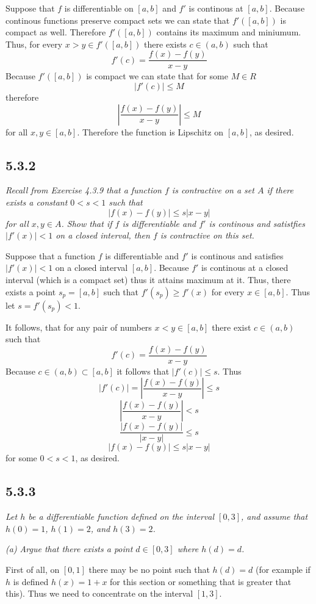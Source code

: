 \documentclass[11pt,oneside,titlepage]{book}
\begin{document}
Suppose that $f$ is differentiable on $[a, b]$ and $f'$ is continous at
$[a, b]$. Because continous functions preserve compact sets we can state that
$f'([a, b])$  is compact as well. Therefore $f'([a, b])$ contains its maximum
and miniumum. Thus, for every  $x > y \in f'([a, b])$ there exists
$c \in (a, b)$ such that
$$f'(c) = \frac{f(x) - f(y)}{x - y}$$
Because $f'([a, b])$ is compact  we can state that for some $M \in R$
$$|f'(c)| \leq M$$
therefore 
$$|\frac{f(x) - f(y)}{x - y}| \leq M$$
for all $x, y \in [a, b]$. Therefore the function is Lipschitz on $[a, b]$,
as desired.

\subsection*{5.3.2}
\textit{Recall from Exercise 4.3.9 that a function $f$ is contractive on a
  set $A$ if there exists a constant $0 < s < 1$ such that }
$$|f(x) - f(y)| \leq s|x - y|$$
\textit{for all $x, y \in A$. Show that if $f$ is differentiable and $f'$ is
  continous and satistfies $|f'(x)| < 1$ on a closed interval, then $f$ is
  contractive on this set.}

Suppose that a function $f$ is differentiable and $f'$ is continous and
satisfies $|f'(x)| < 1$ on a closed interval $[a, b]$. Because $f'$ is
continous at a closed interval (which is a compact set) thus it attains
maximum at it. Thus, there exists a point  $s_p = [a, b]$ such that
$f'(s_p) \geq f'(x)$ for every $x \in [a, b]$. Thus let $s = f'(s_p) < 1$.

It follows, that for
any pair of numbers $x< y \in [a, b]$ there exist $c \in (a, b)$ such that
$$f'(c) = \frac{f(x) - f(y)}{x - y}$$
Because $c \in (a, b) \subset [a, b]$ it follows that $|f'(c)| \leq s$. Thus
$$|f'(c)| = |\frac{f(x) - f(y)}{x - y}| \leq s$$
$$\left|\frac{f(x) - f(y)}{x - y}\right| < s$$
$$\frac{|f(x) - f(y)|}{|x - y|} \leq s$$
$$|f(x) - f(y)| \leq s|x - y|$$
for some $0 < s < 1$, as desired.


\subsection*{5.3.3}
\textit{Let $h$ be a differentiable function defined on the interval $[0, 3]$,
  and assume that $h(0) = 1$, $h(1) = 2$, and $h(3) = 2$.}

\textit{(a) Argue that there exists a point $d \in [0, 3]$ where $h(d) = d$.}

First of all, on $[0, 1]$ there may be no point such that $h(d) = d$
(for example if $h$ is defined $h(x) = 1 + x$ for this section or something
that is greater that this). Thus we need to concentrate on the interval
$[1, 3]$.
\end{document}
